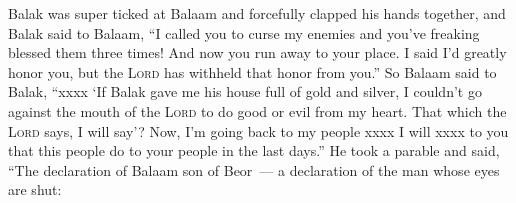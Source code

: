
\begin{inparaenum}
    
    \pvbb{}{}%
    
    
    \pvbb{}{}%
    
    
    
    \pvbb{}{}%
    
    
    \pvbb{}{}%
    
    
    \pvcc{}{}{}%
    
    
    \pvbb{}{}%
    
     Balak was super ticked at Balaam and forcefully clapped his hands together, and Balak said to Balaam, ``I called you to curse my enemies and you've freaking blessed them three times!%
     And now you run away to your place. I said I'd greatly honor you, but the \textsc{Lord} has withheld that honor from you.''%
     So Balaam said to Balak, ``xxxx%
     `If Balak gave me his house full of gold and silver, I couldn't go against the mouth of the \textsc{Lord} to do good or evil from my heart. That which the \textsc{Lord} says, I will say'?%
     Now, I'm going back to my people xxxx I will xxxx to you that this people do to your people in the last days.''%
     He took a parable and said, ``The declaration of Balaam son of Beor~--- a declaration of the man whose eyes are shut:%
    
    \pvbb{}{}%
    
    
    \pvbb{}{}%
    
    
    \pvbb{}{}%
    
    \pvbb{}{}%
    
    
    
    \pvba{}%
    
    
    \pvbb{}{}%
    
    
    \pvbb{}{}%
    
    
    
    
    \pvbb{}{}%
    
\end{inparaenum}

